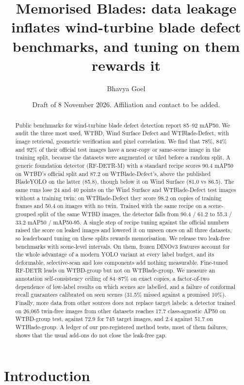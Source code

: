 \documentclass[
  10pt,
]{article}
\title{Memorised Blades: data leakage inflates wind-turbine blade defect
benchmarks, and tuning on them rewards it}
\author{Bhavya Goel}
\date{Draft of 8 November 2026. Affiliation and contact to be added.}
\begin{document}
\maketitle
\begin{abstract}
Public benchmarks for wind-turbine blade defect detection report 85--92
mAP50. We audit the three most used, WTBD, Wind Surface Defect and
WTBlade-Defect, with image retrieval, geometric verification and pixel
correlation. We find that 78\%, 84\% and 92\% of their official test
images have a near-copy or same-scene image in the training split,
because the datasets were augmented or tiled before a random split. A
generic foundation detector (RF-DETR-M) with a standard recipe scores
90.4 mAP50 on WTBD's official split and 87.2 on WTBlade-Defect's, above
the published BladeYOLO on the latter (85.8), though below it on Wind
Surface (81.0 vs 86.5). The same runs lose 24 and 40 points on the Wind
Surface and WTBlade-Defect test images without a training twin: on
WTBlade-Defect they score 98.2 on copies of training frames and 50.4 on
images with no twin. Trained with the same recipe on a scene-grouped
split of the same WTBD images, the detector falls from 90.4 / 61.2 to
55.3 / 33.2 mAP50 / mAP50-95. A single step of recipe tuning against the
official numbers raised the score on leaked images and lowered it on
unseen ones on all three datasets, so leaderboard tuning on these splits
rewards memorisation. We release two leak-free benchmarks with
scene-level intervals. On them, frozen DINOv3 features account for the
whole advantage of a modern YOLO variant at every label budget, and its
deformable, selective-scan and loss components add nothing measurable.
Fine-tuned RF-DETR leads on WTBD-group but not on WTBlade-group. We
measure an annotation self-consistency ceiling of 84--87\% on exact
copies, a factor-of-two dependence of low-label results on which scenes
are labelled, and a failure of conformal recall guarantees calibrated on
seen scenes (31.5\% missed against a promised 10\%). Finally, more data
from other sources does not replace target labels: a detector trained on
26,065 twin-free images from other datasets reaches 17.7 class-agnostic
AP50 on WTBD-group test, against 72.9 for 745 target images, and 2.4
against 51.7 on WTBlade-group. A ledger of our pre-registered method
tests, most of them failures, shows that the usual add-ons do not close
the leak-free gap.
\end{abstract}

\section{Introduction}\label{introduction}
\end{document}
